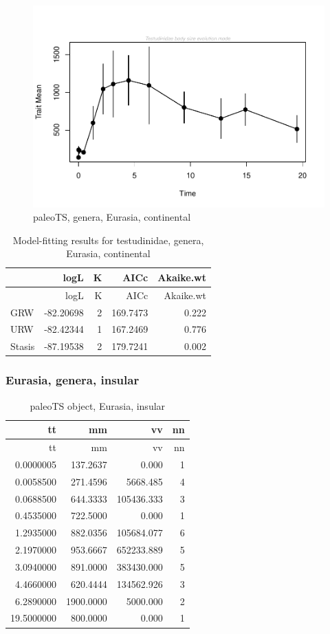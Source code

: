 \begin{figure}[H]
	\centering
	\includegraphics{MA_JJ_files/figure-latex/pTSEsC-1.pdf}
	\caption{paleoTS, genera, Eurasia, continental}
	\label{fig:pTSEsC}
\end{figure}

\begin{longtable}[]{@{}lrrrr@{}}
	\caption{Model-fitting results for testudinidae, genera, Eurasia,
		continental}
	\label{tab:pTSEsCEM}\tabularnewline
	\toprule
	& logL & K & AICc & Akaike.wt\tabularnewline
	\midrule
	\endfirsthead
	\toprule
	& logL & K & AICc & Akaike.wt\tabularnewline
	\midrule
	\endhead
	GRW & -82.20698 & 2 & 169.7473 & 0.222\tabularnewline
	URW & -82.42344 & 1 & 167.2469 & 0.776\tabularnewline
	Stasis & -87.19538 & 2 & 179.7241 & 0.002\tabularnewline
	\bottomrule
\end{longtable}


\FloatBarrier

\subsubsection*{Eurasia, genera,
	insular}\label{eurasiagenera-insular}

\begin{longtable}[]{@{}rrrr@{}}
	\caption{paleoTS object, Eurasia, insular}
	\label{tab:pTSEsI}\tabularnewline
	\toprule
	tt & mm & vv & nn\tabularnewline
	\midrule
	\endfirsthead
	\toprule
	tt & mm & vv & nn\tabularnewline
	\midrule
	\endhead
	0.0000005 & 137.2637 & 0.000 & 1\tabularnewline
	0.0058500 & 271.4596 & 5668.485 & 4\tabularnewline
	0.0688500 & 644.3333 & 105436.333 & 3\tabularnewline
	0.4535000 & 722.5000 & 0.000 & 1\tabularnewline
	1.2935000 & 882.0356 & 105684.077 & 6\tabularnewline
	2.1970000 & 953.6667 & 652233.889 & 5\tabularnewline
	3.0940000 & 891.0000 & 383430.000 & 5\tabularnewline
	4.4660000 & 620.4444 & 134562.926 & 3\tabularnewline
	6.2890000 & 1900.0000 & 5000.000 & 2\tabularnewline
	19.5000000 & 800.0000 & 0.000 & 1\tabularnewline
	\bottomrule
\end{longtable}

